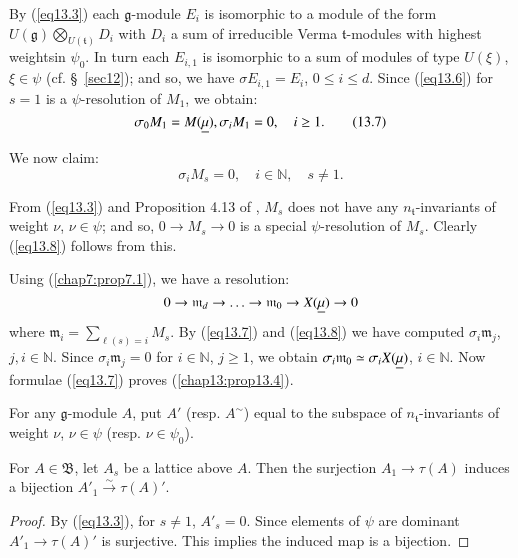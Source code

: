 By (\ref{eq13.3}) each $\mathfrak{g}$-module $E_i$ is isomorphic to a module
of the form $U(\mathfrak{g}) \bigotimes\limits_{U(\mathfrak{t})} D_i$
with $D_i$ a sum of irreducible Verma $\mathfrak{t}$-modules with
highest weights\pageoriginale in $\psi_0$. In turn each $E_{i,1}$ is
isomorphic to a sum of modules of type $U(\xi)$, $\xi \in \psi$
(cf. \S\ \ref{sec12}); and so, we have $\sigma E_{i,1} = E_i$, $0 \leq i \leq
d$. Since (\ref{eq13.6}) for $s=1$ is a $\psi$-resolution of $M_1$, we obtain:
\begin{equation*}
\sigma_0 M_1 = M(\underline{\mu}), \sigma_i M_1 = 0, \quad i \geq 1. 
 \tag{13.7}\label{eq13.7}
\end{equation*}

We now claim:
\begin{equation*}
\sigma_i M_s = 0, \quad i \in \mathbb{N}, \quad s \neq 1.
\tag{13.8}\label{eq13.8}
\end{equation*}

From (\ref{eq13.3}) and Proposition 4.13 of
\cite{key15}, $M_s$ does not have 
any $n_\mathfrak{t}$-invariants of weight $\nu$, $\nu \in \psi$; and
so, $0 \to M_s \to 0$ is a special $\psi$-resolution of $M_s$. Clearly
(\ref{eq13.8}) follows from this. 

Using (\ref{chap7:prop7.1}), we have a resolution:
$$
0 \to \mathfrak{m}_d \to \ldots \to \mathfrak{m}_0 \to X(\underline{\mu}) \to 0
$$ 
where $\mathfrak{m}_i = \sum\limits_{\ell(s)=i} M_s$. By (\ref{eq13.7}) and
(\ref{eq13.8}) we have computed $\sigma_i \mathfrak{m}_j$, $j,i\in
\mathbb{N}$. Since $\sigma_i \mathfrak{m}_j =0$ for $i  \in
\mathbb{N}$, $j \geq 1$, we obtain $\sigma_i \mathfrak{m}_0 \simeq
\sigma_i X(\underline{\mu})$, $i \in \mathbb{N}$. Now formulae (\ref{eq13.7}) proves
(\ref{chap13:prop13.4}). 

For any $\mathfrak{g}$-module $A$, put $A'$ (resp. $A^\sim$) equal to
the subspace of $n_\mathfrak{t}$-invariants of weight $\nu$, $\nu \in
\psi $ (resp. $\nu \in \psi_0$). 

\setcounter{prop}{8}
\begin{lemma}\label{chap13:lem13.9}
For $A \in \mathfrak{B}$, let $A_s$ be a lattice above $A$. Then the
surjection $A_1 \to \tau (A)$ induces a bijection $A'_1
\xrightarrow{\sim} \tau (A)'$. 
\end{lemma}

\begin{proof}
By (\ref{eq13.3}), for $s \neq 1$, $A'_s = 0$. Since elements of $\psi$ are
dominant $A'_1 \to \tau (A)'$ is surjective. This implies the induced
map is a bijection. 
\end{proof}

